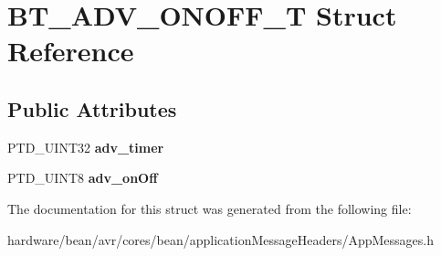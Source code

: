 \hypertarget{struct_b_t___a_d_v___o_n_o_f_f___t}{}\section{B\+T\+\_\+\+A\+D\+V\+\_\+\+O\+N\+O\+F\+F\+\_\+\+T Struct Reference}
\label{struct_b_t___a_d_v___o_n_o_f_f___t}
\subsection*{Public Attributes}
\begin{DoxyCompactItemize}
\item 
\hypertarget{struct_b_t___a_d_v___o_n_o_f_f___t_ae5d71728eac5a5a55cfde06ffbe75f4e}{}P\+T\+D\+\_\+\+U\+I\+N\+T32 {\bfseries adv\+\_\+timer}\label{struct_b_t___a_d_v___o_n_o_f_f___t_ae5d71728eac5a5a55cfde06ffbe75f4e}

\item 
\hypertarget{struct_b_t___a_d_v___o_n_o_f_f___t_aa77a9330146830b6451be534b41ea389}{}P\+T\+D\+\_\+\+U\+I\+N\+T8 {\bfseries adv\+\_\+on\+Off}\label{struct_b_t___a_d_v___o_n_o_f_f___t_aa77a9330146830b6451be534b41ea389}

\end{DoxyCompactItemize}


The documentation for this struct was generated from the following file\+:\begin{DoxyCompactItemize}
\item 
hardware/bean/avr/cores/bean/application\+Message\+Headers/App\+Messages.\+h\end{DoxyCompactItemize}
